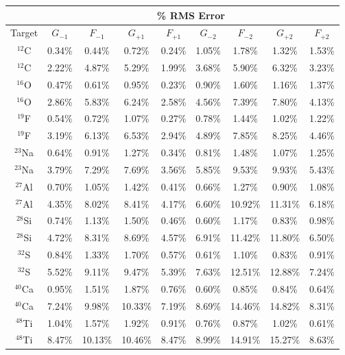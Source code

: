 \documentclass{book}[12pt]
\begin{document}
\begin{table}
\centering
\begin{tabular}{|c|cccccccc|}
\hline
 & \multicolumn{8}{c|}{\% RMS Error}\\
 \hline
Target & $G_{-1}$ & $F_{-1}$ & $G_{+1}$ & $F_{+1}$ & $G_{-2}$ & $F_{-2}$ & $G_{+2}$ & $F_{+2}$ \\
\hline
$^{12}$C & 0.34\% & 0.44\% & 0.72\% & 0.24\% & 1.05\% & 1.78\% & 	1.32\% & 1.53\% \\
$^{12}$C & 2.22\% & 4.87\% & 5.29\% & 1.99\% & 3.68\% & 5.90\% & 6.32\% & 3.23\% \\
\hline
$^{16}$O & 0.47\% & 0.61\% & 0.95\% & 0.23\% & 0.90\% & 1.60\% & 1.16\% & 1.37\% \\
$^{16}$O & 2.86\% & 5.83\% & 6.24\% & 2.58\% & 4.56\% & 7.39\% & 7.80\% & 4.13\% \\
\hline
$^{19}$F & 0.54\% & 0.72\% & 1.07\% & 0.27\% & 0.78\% & 1.44\% & 1.02\% & 1.22\% \\
$^{19}$F & 3.19\% & 6.13\% & 6.53\% & 2.94\% & 4.89\% & 7.85\% & 8.25\% & 4.46\% \\
\hline
$^{23}$Na & 0.64\% & 0.91\% & 1.27\% & 0.34\% & 0.81\% & 1.48\% & 1.07\% & 1.25\% \\
$^{23}$Na & 3.79\% & 7.29\% & 7.69\% & 3.56\% & 5.85\% & 9.53\% & 9.93\% & 5.43\% \\
\hline
$^{27}$Al & 0.70\% & 1.05\% & 1.42\% & 0.41\% & 0.66\% & 1.27\% & 0.90\% & 1.08\% \\
$^{27}$Al & 4.35\% & 8.02\% & 8.41\% & 4.17\% & 6.60\% & 10.92\% & 11.31\% & 6.18\% \\
\hline
$^{28}$Si & 0.74\% & 1.13\% & 1.50\% & 0.46\% & 0.60\% & 1.17\% & 0.83\% & 0.98\% \\
$^{28}$Si & 4.72\% & 8.31\% & 8.69\% & 4.57\% & 6.91\% & 11.42\% & 11.80\% & 6.50\% \\
\hline
$^{32}$S & 0.84\% & 1.33\% & 1.70\% & 0.57\% & 0.61\% & 1.10\% & 0.83\% & 0.91\% \\
$^{32}$S & 5.52\% & 9.11\% & 9.47\% & 5.39\% & 7.63\% & 12.51\% & 12.88\% & 7.24\% \\
\hline
$^{40}$Ca & 0.95\% & 1.51\% & 1.87\% & 0.76\% & 0.60\% & 0.85\% & 0.84\% & 0.64\% \\
$^{40}$Ca & 7.24\% & 9.98\% & 10.33\% & 7.19\% & 8.69\% & 14.46\% & 14.82\% & 8.31\% \\
\hline
$^{48}$Ti & 1.04\% & 1.57\% & 1.92\% & 0.91\% & 0.76\% & 0.87\% &  1.02\% & 0.61\% \\
$^{48}$Ti & 8.47\% & 10.13\% & 10.46\% & 8.47\% & 8.99\% & 14.91\% &  15.27\% & 8.63\% \\

\end{tabular}
\end{table}
\end{document}
